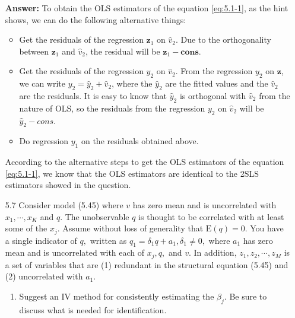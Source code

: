\documentclass[UTF8]{article} %
\begin{document}
\begin{enumerate}
    \textbf{Answer:} To obtain the OLS estimators of the equation \eqref{eq:5.1-1}, as the hint shows, we can do the following alternative things: 
    \begin{itemize}
        \item Get the residuals of the regression $\mathbf{z}_1$ on $\hat{v}_2$. Due to the orthogonality between $\mathbf{z}_1$ and $\hat{v}_2$, the residual will be $\mathbf{z}_1 - \mathbf{cons}$.
        \item Get the residuals of the regression $y_2$ on $\hat{v}_2$. From the regression $y_2$ on $\mathbf{z}$, we can write $y_2 = \hat{y}_2 + \hat{v}_2$, where the $\hat{y}_2$ are the fitted values and the $\hat{v}_2$ are the residuals. It is easy to know that $\hat{y}_2$ is orthogonal with $\hat{v}_2$ from the nature of OLS, so the residuals from the regression $y_2$ on $\hat{v}_2$ will be $\hat{y}_2 - cons$.
        \item Do regression $y_1$ on the residuals obtained above.
    \end{itemize}
    According to the alternative steps to get the OLS estimators of the equation \eqref{eq:5.1-1}, we know that the OLS estimators are identical to the 2SLS estimators showed in the question.
    
    
    \item[5.7] Consider model (5.45) where $v$ has zero mean and is uncorrelated with $x_{1}, \cdots, x_{K}$ and $q .$ The unobservable $q$ is thought to be correlated with at least some of the $x_{j} .$ Assume without loss of generality that $\mathrm{E}(q)=0$. You have a single indicator of $q,$ written as $q_{1}=\delta_{1} q+a_{1}, \delta_{1} \neq 0,$ where $a_{1}$ has zero mean and is uncorrelated with each of $x_{j}, q,$ and $v .$ In addition, $z_{1}, z_{2}, \cdots, z_{M}$ is a set of variables that are (1) redundant in the structural equation (5.45) and (2) uncorrelated with $a_{1}$.
    \begin{enumerate}
        \item Suggest an IV method for consistently estimating the $\beta_{j} .$ Be sure to discuss what is needed for identification.
        

\end{enumerate}
\end{enumerate}
\end{document}
